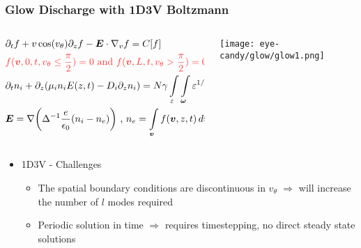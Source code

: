 \documentclass[mathserif, aspectratio=169]{beamer}
\newcommand{\vect}[1]{\boldsymbol{#1}}
\newcommand{\of}[1]{\mleft( #1 \mright)}
\newcommand{\myint}{\int\limits}
\newcommand{\diff}[1]{\, d#1}
\newcommand{\vtheta}{{v_{\theta}}}
\begin{document}
\begin{frame}
	\frametitle{Glow Discharge with 1D3V Boltzmann}
	\begin{columns}
		\begin{column}{0.6\textwidth}
			\footnotesize{
		\begin{align}
			&\partial_t f + v\cos\of{\vtheta} \partial_z f -\vect{E}\cdot\nabla_v f = C[f] \\
			&\textcolor{red!80}{f(\vect{v}, 0, t, \vtheta \leq \frac{\pi}{2})	= 0 \text{ and } f(\vect{v}, L, t, \vtheta > \frac{\pi}{2})	= 0}\\
			&\partial_t n_i + \partial_z \of{\mu_i n_i E\of{z,t} -D_i \partial_z n_i} = N \gamma \myint_{\varepsilon}\myint_{\vect{\omega}} \varepsilon^{1/2} \sigma_i f d\vect{\omega} d\varepsilon \\
			& \vect{E} = \nabla \of{\Delta^{-1}\frac{e}{\epsilon_0} \of{n_i- n_e}} \text{ , } n_e = \myint_{\vect{v}} f\of{\vect{v}, z, t} \diff{\vect{v}}
		\end{align}}
		\end{column}
		\begin{column}{0.4\textwidth}
			\texttt{[image: eye-candy/glow/glow1.png]}
		\end{column}
	\end{columns}


	
	\begin{itemize}
		\item 1D3V - Challenges
		\begin{itemize}
			\item The spatial boundary conditions are discontinuous in $\vtheta$ $\Rightarrow$ will increase the number of $l$ modes required
			\item Periodic solution in time $\Rightarrow$ requires timestepping, no direct steady state solutions
		\end{itemize}
	\end{itemize}
\end{frame}
\end{document}
